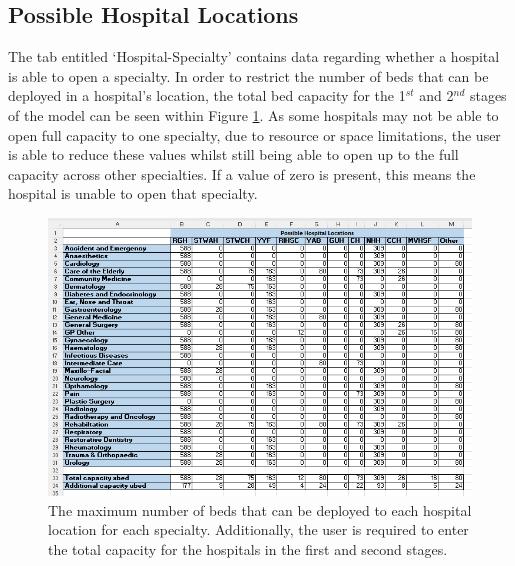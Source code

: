 \documentclass[../thesis.tex]{subfiles}
\begin{document}
\subsection*{Possible Hospital Locations}
The tab entitled `Hospital-Specialty' contains data regarding whether a hospital is able to open a specialty. In order to restrict the number of beds that can be deployed in a hospital's location, the total bed capacity for the 1$^{st}$ and 2$^{nd}$ stages of the model can be seen within Figure \ref{fig:exlocations}. As some hospitals may not be able to open full capacity to one specialty, due to resource or space limitations, the user is able to reduce these values whilst still being able to open up to the full capacity across other specialties. If a value of zero is present, this means the hospital is unable to open that specialty.
\begin{figure}[h!]
    \centering
    \includegraphics[width=\textwidth]{Chapters/Chapter7/Figures/Hospital-Spec.png}
    \caption{The maximum number of beds that can be deployed to each hospital location for each specialty. Additionally, the user is required to enter the total capacity for the hospitals in the first and second stages.}
    \label{fig:exlocations}
\end{figure}
\end{document}
